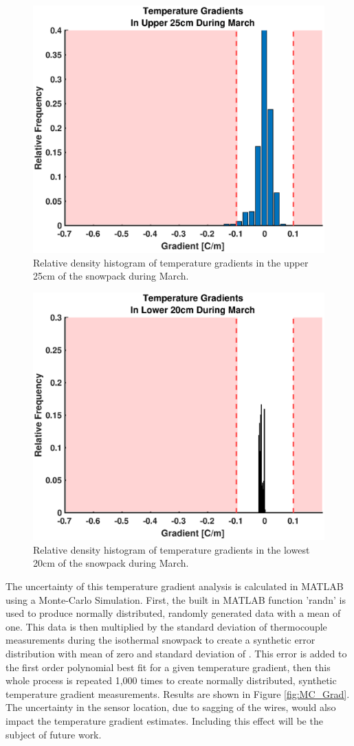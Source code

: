    \begin{figure}[H]
    \centering
    \includegraphics[width=0.7\linewidth]{figures/TempGrad/Mar_U25_RDH.eps}
    \caption{Relative density histogram of temperature gradients in the upper 25cm of the snowpack during March.}
    \label{fig:Mar_U25_RDH}
 \end{figure}
 
   \begin{figure}[H]
    \centering
    \includegraphics[width=0.7\linewidth]{figures/TempGrad/Mar_L20_RDH.eps}
    \caption{Relative density histogram of temperature gradients in the lowest 20cm of the snowpack during March.}
    \label{fig:Mar_L20_RDH}
 \end{figure}
 
The uncertainty of this temperature gradient analysis is calculated in MATLAB using a Monte-Carlo Simulation. First, the built in MATLAB function 'randn' is used to produce normally distributed, randomly generated data with a mean of one. This data is then multiplied by the standard deviation of thermocouple measurements during the isothermal snowpack to create a synthetic error distribution with mean of zero and standard deviation of \isostd. This error is added to the first order polynomial best fit for a given temperature gradient, then this whole process is repeated 1,000 times to create normally distributed, synthetic temperature gradient measurements. Results are shown in Figure \ref{fig:MC_Grad}. The uncertainty in the sensor location, due to sagging of the wires, would also impact the temperature gradient estimates.  Including this effect will be the subject of future work.


